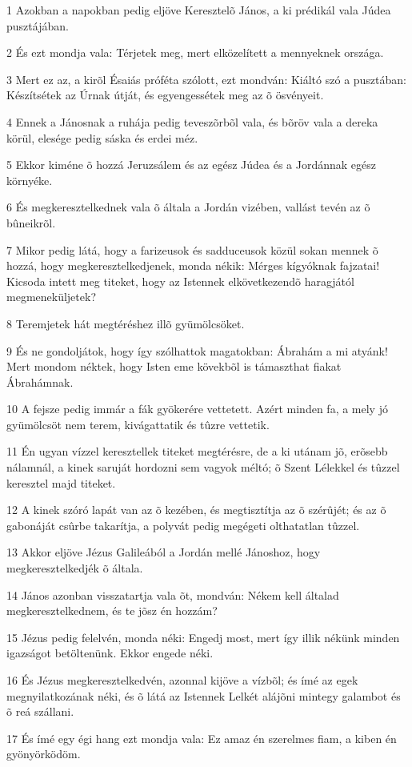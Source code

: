 \par 1 Azokban a napokban pedig eljöve Keresztelõ János, a ki prédikál vala Júdea pusztájában.
\par 2 És ezt mondja vala: Térjetek meg, mert elközelített a mennyeknek országa.
\par 3 Mert ez az, a kirõl Ésaiás próféta szólott, ezt mondván: Kiáltó szó a pusztában: Készítsétek az Úrnak útját, és egyengessétek meg az õ ösvényeit.
\par 4 Ennek a Jánosnak a ruhája pedig teveszõrbõl vala, és bõröv vala a dereka körül, elesége pedig sáska és erdei méz.
\par 5 Ekkor kiméne õ hozzá Jeruzsálem és az egész Júdea és a Jordánnak egész környéke.
\par 6 És megkeresztelkednek vala õ általa a Jordán vizében, vallást tevén az õ bûneikrõl.
\par 7 Mikor pedig látá, hogy a farizeusok és sadduceusok közül sokan mennek õ hozzá, hogy megkeresztelkedjenek, monda nékik: Mérges kígyóknak fajzatai! Kicsoda intett meg titeket, hogy az Istennek elkövetkezendõ haragjától megmeneküljetek?
\par 8 Teremjetek hát megtéréshez illõ gyümölcsöket.
\par 9 És ne gondoljátok, hogy így szólhattok magatokban: Ábrahám a mi atyánk! Mert mondom néktek, hogy Isten eme kövekbõl is támaszthat fiakat Ábrahámnak.
\par 10 A fejsze pedig immár a fák gyökerére vettetett. Azért minden fa, a mely jó gyümölcsöt nem terem, kivágattatik és tûzre vettetik.
\par 11 Én ugyan vízzel keresztellek titeket megtérésre, de a ki utánam jõ, erõsebb nálamnál, a kinek saruját hordozni sem vagyok méltó;  õ Szent Lélekkel és tûzzel keresztel majd titeket.
\par 12 A kinek szóró lapát van az õ kezében, és megtisztítja az õ szérûjét; és az õ gabonáját csûrbe takarítja, a polyvát pedig megégeti olthatatlan tûzzel.
\par 13 Akkor eljöve Jézus Galileából a Jordán mellé Jánoshoz, hogy megkeresztelkedjék õ általa.
\par 14 János azonban visszatartja vala õt, mondván: Nékem kell általad megkeresztelkednem, és te jõsz én hozzám?
\par 15 Jézus pedig felelvén, monda néki: Engedj most, mert így illik nékünk minden igazságot betöltenünk. Ekkor engede néki.
\par 16 És Jézus megkeresztelkedvén, azonnal kijöve a vízbõl; és ímé az egek megnyilatkozának néki, és õ látá az Istennek Lelkét alájõni mintegy galambot és õ reá szállani.
\par 17 És ímé egy égi hang ezt mondja vala: Ez amaz én szerelmes fiam, a kiben  én gyönyörködöm.

